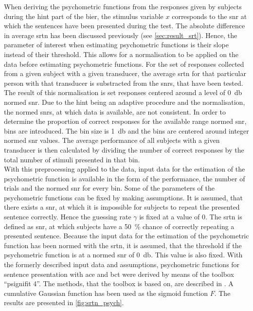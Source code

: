 \stopexplain
When deriving the psychometric functions from the responses given by subjects during the \gls{hint} part of the \gls{bier}, the stimulus variable $x$ corresponds to the \gls{snr} at which the sentences have been presented during the test.
The absolute difference in average \gls{srtn} has been discussed previously (see \autoref{sec:result_srt}). Hence, the parameter of interest when estimating psychometric functions is their slope instead of their threshold.
This allows for a normalisation to be applied on the data before estimating psychometric functions.
For the set of responses collected from a given subject with a given transducer, the average \gls{srtn} for that particular person with that transducer is substracted from the \gls{snr}s, that have been tested.
The result of this normalisation is set responses centered around a level of \SI{0}{\decibel} normed \gls{snr}.
Due to the \gls{hint} being an adaptive procedure and the normalisation, the normed \gls{snr}s, at which data is available, are not consistent.
In order to determine the proportion of correct responses for the available range normed \gls{snr}, bins are introduced.
The bin size is \SI{1}{\decibel} and the bins are centered around integer normed \gls{snr} values. 
The average performance of all subjects with a given transducer is then calculated by dividing the number of correct responses by the total number of stimuli presented in that bin.\\
With this preprocessing applied to the data, input data for the estimation of the psychometric function is available in the form of the performance, the number of trials and the normed \gls{snr} for every bin.
Some of the parameters of the psychometric functions can be fixed by making assumptions. It is assumed, that there exists a \gls{snr}, at which it is impossible for subjects to repeat the presented sentence correctly. Hence the guessing rate $\gamma$ is fixed at a value of 0.
The \gls{srtn} is defined as \gls{snr}, at which subjects have a \SI{50}{\percent} chance of correctly repeating a presented sentence. Because the input data for the estimation of the psychometric function has been normed with the \gls{srtn}, it is assumed, that the threshold if the psychometric function is at a normed \gls{snr} of \SI{0}{\decibel}. This value is also fixed. 
With the formerly described input data and assumptions, psychometric functions for sentence presentation with \gls{ace} and \gls{bct} were derived by means of the \matlab toolbox \enquote{psignifit 4}. The methods, that the toolbox is based on, are described in \citep{schuett_16}. A cumulative Gaussian function has been used as the sigmoid function $F$.
The results are presented in \autoref{fig:srtn_psych}.



